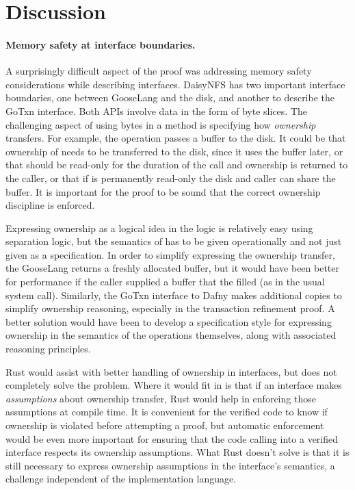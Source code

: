 \section{Discussion}

\paragraph{Memory safety at interface boundaries.}
A surprisingly difficult aspect of the proof was addressing memory safety
considerations while describing interfaces.
DaisyNFS has two important interface boundaries, one between GooseLang and the
disk, and another to describe the GoTxn interface. Both APIs involve data in the
form of byte slices. The challenging aspect of using bytes in a method is
specifying how \emph{ownership} transfers. For example, the 
operation passes a buffer  to the disk. It could be that ownership of
 needs to be transferred to the disk, since it uses the buffer later, or
that  should be read-only for the duration of the call and ownership is
returned to the caller, or that if  is permanently read-only the disk and
caller can share the buffer. It is important for the proof to be sound that the
correct ownership discipline is enforced.

Expressing ownership as a logical idea in the logic is relatively easy using
separation logic, but the semantics of  has to be
given operationally and not just given as a specification. In order to simplify expressing the ownership transfer, the
GooseLang  returns a freshly allocated buffer, but it would have
been better for performance if the caller supplied a buffer that the
 filled (as in the usual  system call). Similarly, the
GoTxn interface to Dafny makes additional copies to simplify ownership
reasoning, especially in the transaction refinement proof. A better solution would
have been to develop a specification style for expressing ownership in the
semantics of the operations themselves, along with associated reasoning
principles.

Rust would assist with better handling of ownership in interfaces, but does
not completely solve the problem. Where it would fit in is that if an interface
makes \emph{assumptions} about ownership transfer, Rust would help in enforcing
those assumptions at compile time. It is convenient for the verified code to
know if ownership is violated before attempting a proof, but automatic
enforcement would be even more important for ensuring that the code calling into
a verified interface respects its ownership assumptions.
What Rust doesn't solve is that it is
still necessary to express ownership assumptions in the interface's semantics, a challenge
independent of the implementation language.

